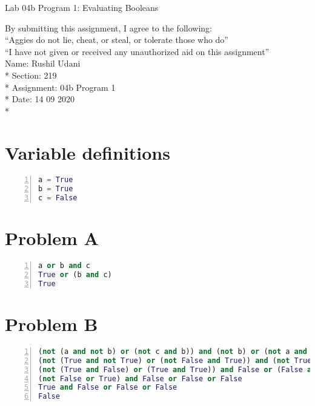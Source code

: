 \documentclass{article}
\begin{document}
{\Large Lab 04b Program 1: Evaluating Booleans}
\vspace{0.5cm}

\noindent
By submitting this assignment, I agree to the following: \\
 ``Aggies do not lie, cheat, or steal, or tolerate those who do'' \\
 ``I have not given or received any unauthorized aid on this assignment'' \\

\noindent
Name:        Rushil Udani \\*
Section:     219 \\*
Assignment:  04b Program 1 \\*
Date:        14 09 2020 \\*

\hrulefill

\section*{Variable definitions}

\begin{lstlisting}[language=Python, breaklines=True, numbers=left]
a = True
b = True
c = False
\end{lstlisting}

\section*{Problem A}
\begin{lstlisting}[language=Python, breaklines=True, numbers=left]
a or b and c
True or (b and c)
True
\end{lstlisting}

\section*{Problem B}
\begin{lstlisting}[language=Python, breaklines=True, numbers=left]
(not (a and not b) or (not c and b)) and (not b) or (not a and b and not c) or (a and not b)
(not (True and not True) or (not False and True)) and (not True) or (not True and True and not False) or (True and not True)
(not (True and False) or (True and True)) and False or (False and True and True) or (True and False)
(not False or True) and False or False or False
True and False or False or False
False
\end{lstlisting}
\end{document}
